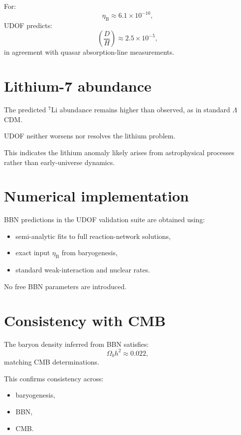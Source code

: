 \documentclass[11pt]{book}
\newcommand{\etaB}{\eta_{\mathrm{B}}}
\begin{document}
For:
\begin{equation}
\etaB \approx 6.1\times10^{-10},
\end{equation}
UDOF predicts:
\begin{equation}
\left(\frac{D}{H}\right)
\approx 2.5\times10^{-5},
\end{equation}
in agreement with quasar absorption-line measurements.

\section{Lithium-7 abundance}

The predicted ${}^7\mathrm{Li}$ abundance remains higher than observed,
as in standard $\Lambda$CDM.

UDOF neither worsens nor resolves the lithium problem.

This indicates the lithium anomaly likely arises from astrophysical
processes rather than early-universe dynamics.

\section{Numerical implementation}

BBN predictions in the UDOF validation suite are obtained using:
\begin{itemize}
\item semi-analytic fits to full reaction-network solutions,
\item exact input $\etaB$ from baryogenesis,
\item standard weak-interaction and nuclear rates.
\end{itemize}

No free BBN parameters are introduced.

\section{Consistency with CMB}

The baryon density inferred from BBN satisfies:
\begin{equation}
\Omega_b h^2 \approx 0.022,
\end{equation}
matching CMB determinations.

This confirms consistency across:
\begin{itemize}
\item baryogenesis,
\item BBN,
\item CMB.
\end{itemize}
\end{document}
